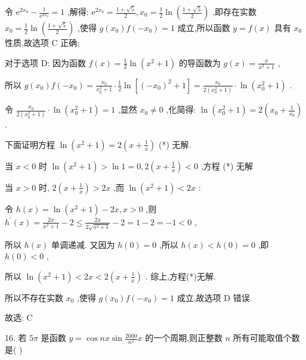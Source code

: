 \documentclass[10pt]{article}
\begin{document}
令 \({\mathrm{e}}^{2{x}_{0}} - \frac{1}{{\mathrm{e}}^{2{x}_{0}}} = 1\) ,解得: \({\mathrm{e}}^{2{x}_{0}} = \frac{1 + \sqrt{5}}{2},{x}_{0} = \frac{1}{2}\ln \left( \frac{1 + \sqrt{5}}{2}\right)\) ,即存在实数 \({x}_{0} = \frac{1}{2}\ln \left( \frac{1 + \sqrt{5}}{2}\right)\) ,使得 \(g\left( {x}_{0}\right) f\left( {-{x}_{0}}\right)  = 1\) 成立,所以函数 \(y = f\left( x\right)\) 具有 \({x}_{0}\) 性质,故选项 \(\mathrm{C}\) 正确;

对于选项 D: 因为函数 \(f\left( x\right)  = \frac{1}{2}\ln \left( {{x}^{2} + 1}\right)\) 的导函数为 \(g\left( x\right)  = \frac{x}{{x}^{2} + 1}\) ,

所以 \(g\left( {x}_{0}\right) f\left( {-{x}_{0}}\right)  = \frac{{x}_{0}}{{x}_{0}^{2} + 1} \cdot  \frac{1}{2}\ln \left\lbrack  {{\left( -{x}_{0}\right) }^{2} + 1}\right\rbrack   = \frac{{x}_{0}}{2\left( {{x}_{0}^{2} + 1}\right) } \cdot  \ln \left( {{x}_{0}^{2} + 1}\right)\) .

令 \(\frac{{x}_{0}}{2\left( {{x}_{0}^{2} + 1}\right) } \cdot  \ln \left( {{x}_{0}^{2} + 1}\right)  = 1\) ,显然 \({x}_{0} \neq  0\) ,化简得: \(\ln \left( {{x}_{0}^{2} + 1}\right)  = 2\left( {{x}_{0} + \frac{1}{{x}_{0}}}\right)\) .

下面证明方程 \(\ln \left( {{x}^{2} + 1}\right)  = 2\left( {x + \frac{1}{x}}\right)\) (*) 无解.

当 \(x < 0\) 时 \(\ln \left( {{x}^{2} + 1}\right)  > \ln 1 = 0,2\left( {x + \frac{1}{x}}\right)  < 0\) ,方程 (*) 无解

当 \(x > 0\) 时, \(2\left( {x + \frac{1}{x}}\right)  > {2x}\) ,而 \(\ln \left( {{x}^{2} + 1}\right)  < {2x}\) :

令 \(h\left( x\right)  = \ln \left( {{x}^{2} + 1}\right)  - {2x},x > 0\) ,则 \({h}^{\prime }\left( x\right)  = \frac{2x}{{x}^{2} + 1} - 2 \leq  \frac{2x}{2\sqrt{{x}^{2} \times  1}} - 2 = 1 - 2 =  - 1 < 0\) ,

所以 \(h\left( x\right)\) 单调递减. 又因为 \(h\left( 0\right)  = 0\) ,所以 \(h\left( x\right)  < h\left( 0\right)  = 0\) ,即 \(h\left( 0\right)  < 0\) ,

所以 \(\ln \left( {{x}^{2} + 1}\right)  < {2x} < 2\left( {x + \frac{1}{x}}\right)\) . 综上,方程(*)无解.

所以不存在实数 \({x}_{0}\) ,使得 \(g\left( {x}_{0}\right) f\left( {-{x}_{0}}\right)  = 1\) 成立,故选项 \(\mathrm{D}\) 错误.

故选: \(\mathrm{C}\)

16. 若 \({5\pi }\) 是函数 \(y = \cos {nx}\sin \frac{2000}{{n}^{2}}x\) 的一个周期,则正整数 \(n\) 所有可能取值个数是( )
\end{document}
